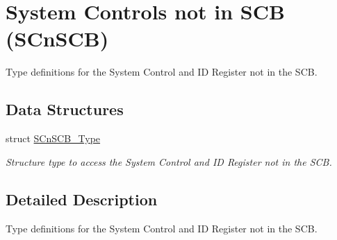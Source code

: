 \hypertarget{group___c_m_s_i_s___s_cn_s_c_b}{\section{System Controls not in S\-C\-B (S\-Cn\-S\-C\-B)}
\label{group___c_m_s_i_s___s_cn_s_c_b}
}


Type definitions for the System Control and I\-D Register not in the S\-C\-B.  


\subsection*{Data Structures}
\begin{DoxyCompactItemize}
\item 
struct \hyperlink{struct_s_cn_s_c_b___type}{S\-Cn\-S\-C\-B\-\_\-\-Type}
\begin{DoxyCompactList}\small\item\em Structure type to access the System Control and I\-D Register not in the S\-C\-B. \end{DoxyCompactList}\end{DoxyCompactItemize}


\subsection{Detailed Description}
Type definitions for the System Control and I\-D Register not in the S\-C\-B. 